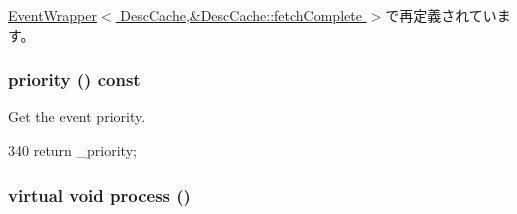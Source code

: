 \hyperlink{classEventWrapper_a6490f765a824ced1cc94979609fe7e07}{EventWrapper$<$ DescCache,\&DescCache::fetchComplete $>$}で再定義されています。\hypertarget{classEvent_af295b292a101253257e5c9bea7ca67e3}{
\subsubsection[{priority}]{ priority () const}}
\label{classEvent_af295b292a101253257e5c9bea7ca67e3}


Get the event priority. 


\begin{DoxyCode}
340 { return _priority; }
\end{DoxyCode}
\hypertarget{classEvent_a142b75b68a6291400e20fb0dd905b1c8}{
\subsubsection[{process}]{\setlength{\rightskip}{0pt plus 5cm}virtual void process ()}}
\label{classEvent_a142b75b68a6291400e20fb0dd905b1c8}


